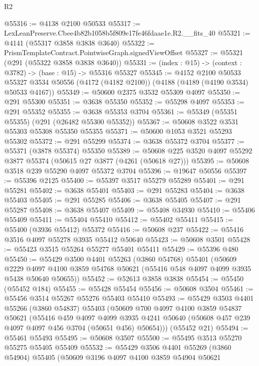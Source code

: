 \begin{lexlean}{R2}
\begin{coremodule}
@55316 := @4138 @2100 @50533
@55317 := LexLeanPreserve.Cbee4b82b1058b5f809e17fe46fdaae1e.R2.__fits_40
@55321 := @4141 (@55317 @3858 @3838 @3640)
@55322 := PrismTemplateContract.PointwiseGraph.signedViewOffset
@55327 := @55321 (@291 (@55322 @3858 @3838 @3640))
@55331 := (index : @15) -> (context : @3782) -> (base : @15) -> @55316 @55327
@55345 := @4152
    @2100
    @50533
    @55327
    @3534
    @50556
    (@4172 (@4182 @2100))
    (@4188 (@4189 (@4190 @3534) @50533 @4167))
@55349 := @50600 @2375 @3532 @55309 @4097
@55350 := @291 @55300
@55351 := @3638 @55350
@55352 := @55298 @4097
@55353 := @291 @55352
@55355 := @3638 @55353 @3704
@55361 := @55349 (@55351 @55355) (@291 (@26482 @55300 @55352))
@55367 := @50608 @3522 @3531 @55303 @55308 @55350 @55355
@55371 := @50600 @1053 @3521 @55293 @55302
@55372 := @291 @55299
@55374 := @3638 @55372 @3704
@55377 := @55371 (@3878 @55374) @55350
@55389 := @50608 @225 @3520 @4097 @55292 @3877 @55374 (@50615 @27 @3877 (@4261 (@50618 @27)))
@55395 := @50608 @3518 @239 @55290 @4097 @55372 @3704
@55396 := @19647 @50556
@55397 := @55396 @2125
@55400 := @55397 @3517 @55279 @55289
@55401 := @291 @55281
@55402 := @3638 @55401
@55403 := @291 @55283
@55404 := @3638 @55403
@55405 := @291 @55285
@55406 := @3638 @55405
@55407 := @291 @55287
@55408 := @3638 @55407
@55409 := @55408 @34930
@55410 := @55406 @55409
@55411 := @55404 @55410
@55412 := @55402 @55411
@55415 := @55400 (@3936 @55412) @55372
@55416 := @50608 @237
@55422 := @55416 @3516 @4097 @55278 @3935 @55412 @50640
@55423 := @50608 @3501
@55428 := @55423 @3515 @55264 @55277 @55401 @55411
@55429 := @55396 @480
@55450 := @55429
    @3500
    @4401
    @55263
    (@3860 @54768)
    @55401
    (@50609
      @2229
      @4097
      @4100
      @3859
      @54768
      @50621
      (@55416 @548 @4097 @4099 @3935 @5438 @50640 @50655))
@55452 := @52613 @3858 @3838
@55454 := @55450 (@55452 @184)
@55455 := @55428 @55454
@55456 := @50608 @3504
@55461 := @55456 @3514 @55267 @55276 @55403 @55410
@55493 := @55429
    @3503
    @4401
    @55266
    (@3860 @54837)
    @55403
    (@50609
      @700
      @4097
      @4100
      @3859
      @54837
      @50621
      (@55416
        @459
        @4097
        @4099
        @3935
        @4241
        @50640
        (@50608 @457 @239 @4097 @4097 @456 @3704 (@50651 @456) @50654)))
    (@55452 @21)
@55494 := @55461 @55493
@55495 := @50608 @3507
@55500 := @55495 @3513 @55270 @55275 @55405 @55409
@55532 := @55429
    @3506
    @4401
    @55269
    (@3860 @54904)
    @55405
    (@50609
      @3196
      @4097
      @4100
      @3859
      @54904
      @50621

\end{coremodule}
\end{lexlean}

